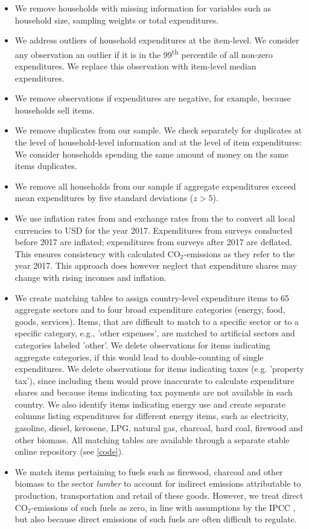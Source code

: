 \documentclass[12pt, a4paper]{article}
\begin{document}
\begin{itemize}
    \item We remove households with missing information for variables such as household size, sampling weights or total expenditures.
    \item We address outliers of household expenditures at the item-level. We consider any observation an outlier if it is in the 99\textsuperscript{th} percentile of all non-zero expenditures. We replace this observation with item-level median expenditures.
    \item We remove observations if expenditures are negative, for example, because households sell items.
    \item We remove duplicates from our sample. We check separately for duplicates at the level of household-level information and at the level of item expenditures: We consider households spending the same amount of money on the same items duplicates.
    \item We remove all households from our sample if aggregate expenditures exceed mean expenditures by five standard deviations ($z>5$).
    \item We use inflation rates from \textcite{IMF.2020} and exchange rates from the \textcite{WorldBankGroup.2023} to convert all local currencies to USD for the year 2017. Expenditures from surveys conducted before 2017 are inflated; expenditures from surveys after 2017 are deflated. This ensures consistency with calculated CO$_{2}$-emissions as they refer to the year 2017. This approach does however neglect that expenditure shares may change with rising incomes and inflation.
    \item We create matching tables to assign country-level expenditure items to 65 aggregate sectors and to four broad expenditure categories (energy, food, goods, services). Items, that are difficult to match to a specific sector or to a specific category, e.g., 'other expenses', are matched to artificial sectors and categories labeled 'other'. We delete observations for items indicating aggregate categories, if this would lead to double-counting of single expenditures. We delete observations for items indicating taxes (e.g. 'property tax'), since including them would prove inaccurate to calculate expenditure shares and because items indicating tax payments are not available in each country. We also identify items indicating energy use and create separate columns listing expenditures for different energy items, such as electricity, gasoline, diesel, kerosene, LPG, natural gas, charcoal, hard coal, firewood and other biomass. All matching tables are available through a separate stable online repository (see \ref{code}).
    \item We match items pertaining to fuels such as firewood, charcoal and other biomass to the sector \textit{lumber} to account for indirect emissions attributable to production, transportation and retail of these goods. However, we treat direct CO$_{2}$-emissions of such fuels as zero, in line with assumptions by the IPCC \autocite{Grad.2023}, but also because direct emissions of such fuels are often difficult to regulate.
\end{itemize}
\end{document}
